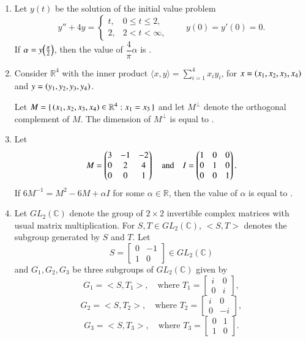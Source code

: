 \documentclass[journal,12pt,onecolumn]{IEEEtran}
\theoremstyle{remark}
\begin{document}
\begin{enumerate}[start=1, label=Q.\arabic*]
\hfill{}


\item Let $y(t)$ be the solution of the initial value problem
\[
y''+4y=
\begin{cases}
t, & 0\le t\le 2,\\
2, & 2<t<\infty,
\end{cases}
\qquad
y(0)=y'(0)=0.
\]
If $\alpha=y\!\left(\tfrac{\pi}{2}\right)$, then the value of $\dfrac{4}{\pi}\alpha$ is \underline{\hspace{2cm}} .

\hfill{}


\item Consider $\mathbb{R}^{4}$ with the inner product $\langle x,y\rangle=\sum_{i=1}^{4}x_{i}y_{i}$, for $x=\left(x_{1},x_{2},x_{3},x_{4}\right)$ and $y=\left(y_{1},y_{2},y_{3},y_{4}\right)$.  

Let $M=\{\, \left(x_{1},x_{2},x_{3},x_{4}\right)\in \mathbb{R}^{4} : x_{1}=x_{3}\,\}$ and let $M^{\perp}$ denote the orthogonal complement of $M$. The dimension of $M^{\perp}$ is equal to \underline{\hspace{2cm}}.

\hfill{}


\item Let
\[
M=\begin{pmatrix}3 & -1 & -2\\ 0 & 2 & 4\\ 0 & 0 & 1\end{pmatrix}
\quad \text{and} \quad
I=\begin{pmatrix}1 & 0 & 0\\ 0 & 1 & 0\\ 0 & 0 & 1\end{pmatrix}.
\]
If $6M^{-1}=M^{2}-6M+\alpha I$ for some $\alpha \in \mathbb{R}$, then the value of $\alpha$ is equal to \underline{\hspace{2cm}}.

\hfill{}

\item Let $GL_{2}(\mathbb{C})$ denote the group of $2 \times 2$ invertible complex matrices with usual matrix multiplication. For $S, T \in GL_{2}(\mathbb{C})$, $<S, T>$ denotes the subgroup generated by $S$ and $T$. Let 
\[
S = \begin{bmatrix} 0 & -1 \\ 1 & 0 \end{bmatrix} \in GL_{2}(\mathbb{C})
\]
and $G_{1}, G_{2}, G_{3}$ be three subgroups of $GL_{2}(\mathbb{C})$ given by 
\[
G_{1} = <S, T_{1}>, \quad \text{where } T_{1} = \begin{bmatrix} i & 0 \\ 0 & i \end{bmatrix},
\]
\[
G_{2} = <S, T_{2}>, \quad \text{where } T_{2} = \begin{bmatrix} i & 0 \\ 0 & -i \end{bmatrix},
\]
\[
G_{3} = <S, T_{3}>, \quad \text{where } T_{3} = \begin{bmatrix} 0 & 1 \\ 1 & 0 \end{bmatrix}.
\]


\end{enumerate}
\end{document}

